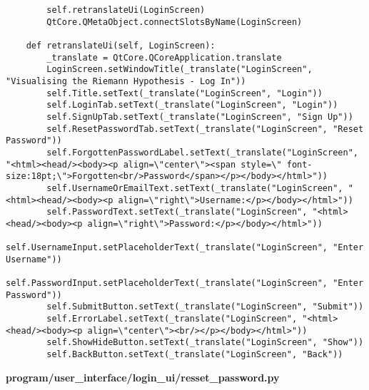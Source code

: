 \documentclass{article}
\begin{document}
\begin{lstlisting}
        self.retranslateUi(LoginScreen)
        QtCore.QMetaObject.connectSlotsByName(LoginScreen)

    def retranslateUi(self, LoginScreen):
        _translate = QtCore.QCoreApplication.translate
        LoginScreen.setWindowTitle(_translate("LoginScreen", "Visualising the Riemann Hypothesis - Log In"))
        self.Title.setText(_translate("LoginScreen", "Login"))
        self.LoginTab.setText(_translate("LoginScreen", "Login"))
        self.SignUpTab.setText(_translate("LoginScreen", "Sign Up"))
        self.ResetPasswordTab.setText(_translate("LoginScreen", "Reset Password"))
        self.ForgottenPasswordLabel.setText(_translate("LoginScreen", "<html><head/><body><p align=\"center\"><span style=\" font-size:18pt;\">Forgotten<br/>Password</span></p></body></html>"))
        self.UsernameOrEmailText.setText(_translate("LoginScreen", "<html><head/><body><p align=\"right\">Username:</p></body></html>"))
        self.PasswordText.setText(_translate("LoginScreen", "<html><head/><body><p align=\"right\">Password:</p></body></html>"))
        self.UsernameInput.setPlaceholderText(_translate("LoginScreen", "Enter Username"))
        self.PasswordInput.setPlaceholderText(_translate("LoginScreen", "Enter Password"))
        self.SubmitButton.setText(_translate("LoginScreen", "Submit"))
        self.ErrorLabel.setText(_translate("LoginScreen", "<html><head/><body><p align=\"center\"><br/></p></body></html>"))
        self.ShowHideButton.setText(_translate("LoginScreen", "Show"))
        self.BackButton.setText(_translate("LoginScreen", "Back"))
\end{lstlisting}


\textbf{program/user\_interface/login\_ui/resset\_password.py}
\end{document}
